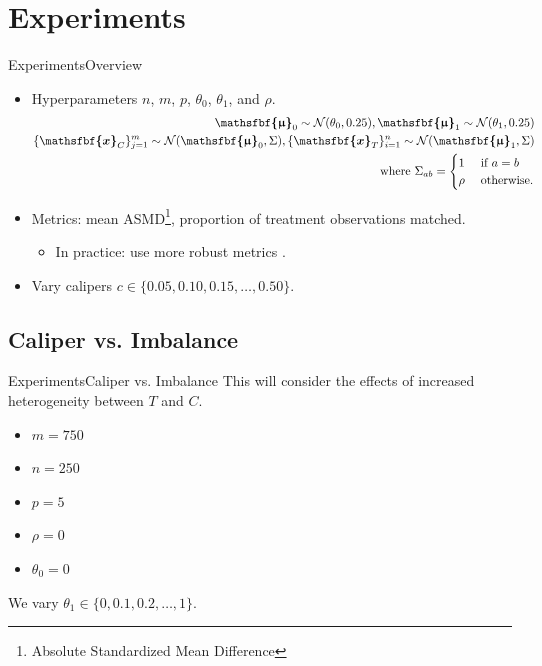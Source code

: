 \documentclass[11pt, compress]{beamer}
\renewcommand{\vec}[1]{\ensuremath{\boldsymbol{\mathsfbf{#1}}}}
\begin{document}
\section{Experiments}
\begin{frame}{Experiments}{Overview}
	\begin{itemize}
		\item Hyperparameters $n$, $m$, $p$, $\theta_0$, $\theta_1$, and $\rho$.
	\begin{align}
		\vec{\upmu}_0 \sim \mathcal N(\theta_0, 0.25), \vec{\upmu}_1 \sim \mathcal N(\theta_1, 0.25) \\
		\{\vec{x}_C\}_{j=1}^{m} \sim \mathcal N(\vec{\upmu}_0, \Sigma), \{\vec{x}_T\}_{i=1}^{n} \sim \mathcal N(\vec{\upmu}_1, \Sigma) \\
		\text{ where } \Sigma_{a b} = \begin{cases}
			1 & \text{ if } a = b \\
			\rho & \text{ otherwise.}
		\end{cases}
	\end{align}
		\item Metrics: mean ASMD\footnote{Absolute Standardized Mean Difference}, proportion of treatment observations matched.
		\begin{itemize}
			\item In practice: use more robust metrics \parencite{basu_use_2008, zhu_kernel-based_2018}.
		\end{itemize}
		\item Vary calipers $c \in \{0.05, 0.10, 0.15, \ldots, 0.50\}$.
	\end{itemize}
\end{frame}


\subsection{Caliper vs. Imbalance}
\begin{frame}{Experiments}{Caliper vs. Imbalance}
	This will consider the effects of increased heterogeneity between $T$ and $C$.
	\begin{itemize}
		\item $m = 750$
		\item $n = 250$
		\item $p = 5$
		\item $\rho = 0$
		\item $\theta_0 = 0$
	\end{itemize}
	We vary $\theta_1 \in \{0, 0.1, 0.2, \ldots, 1\}$.
\end{frame}
\end{document}

